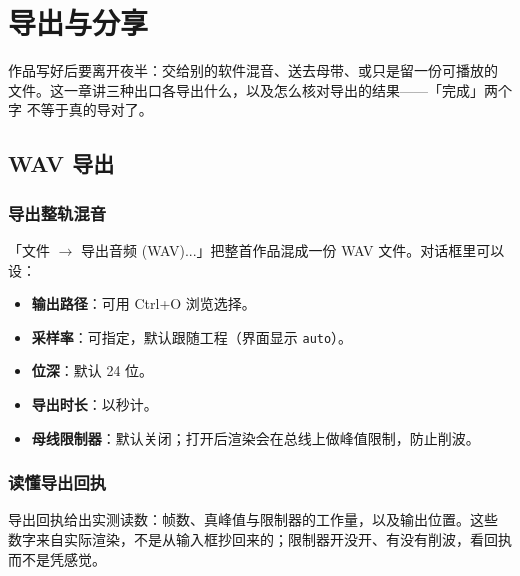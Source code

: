 
\chapter{导出与分享}
\label{ch:export-sharing}






作品写好后要离开夜半：交给别的软件混音、送去母带、或只是留一份可播放的
文件。这一章讲三种出口各导出什么，以及怎么核对导出的结果——「完成」两个字
不等于真的导对了。

\section{WAV 导出}

\subsection{导出整轨混音}

「文件 $\to$ 导出音频 (WAV)...」把整首作品混成一份 WAV 文件。对话框里可以设：

\begin{itemize}
  \item \textbf{输出路径}：可用 Ctrl+O 浏览选择。
  \item \textbf{采样率}：可指定，默认跟随工程（界面显示 \texttt{auto}）。
  \item \textbf{位深}：默认 24 位。
  \item \textbf{导出时长}：以秒计。
  \item \textbf{母线限制器}：默认关闭；打开后渲染会在总线上做峰值限制，防止削波。
\end{itemize}


\subsection{读懂导出回执}

导出回执给出实测读数：帧数、真峰值与限制器的工作量，以及输出位置。这些
数字来自实际渲染，不是从输入框抄回来的；限制器开没开、有没有削波，看回执
而不是凭感觉。

